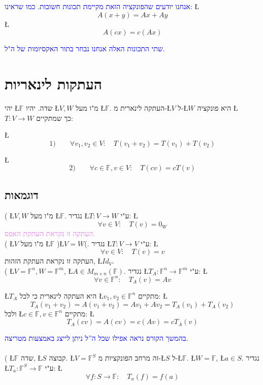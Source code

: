 \documentclass[english,hebrew]{article}
\begin{document}
\textcolor{blue}{אנחנו יודעים שהפונקציה הזאת מקיימת תכונות חשובות.
כמו שראינו:} \L{%
\[
A(x+y)=Ax+Ay
\]
}%
\L{%
\[
A(cx)=c(Ax)
\]
}%

\textcolor{blue}{שתי התכונות האלה אנחנו נבחר בתור האקסיומות של ה"ל.}

\section{העתקות לינאריות}

יהי \L{$\mathbb{F}$} שדה. יהיו \L{$V,W$} מ"ו מעל \L{$\mathbb{F}$}.
העתקה לינארית מ-\L{$V$} ל-\L{$W$} היא פונקציה \L{$T:V\to W$} כך
שמתקיים: 

\L{%
\[
1)\qquad\forall v_{1},v_{2}\in V:\quad T(v_{1}+v_{2})=T(v_{1})+T(v_{2})
\]
}%

\L{%
\[
2)\qquad\forall c\in\mathbb{F},v\in V:\quad T(cv)=cT(v)
\]
}%

\subsection{דוגמאות}

{\endL}( \L{$V,W$} מ"ו מעל \L{$\mathbb{F}$}. נגדיר \L{$T:V\to W$}
ע"י: \L{%
\[
\forall v\in V:\quad T(v)=0_{W}
\]
}%
\textcolor{violet}{העתקה זו נקראת העתקת האפס.}\\

{\endL}( \L{$V$} מ"ו מעל \L{$\mathbb{F}$} )\L{$V=W$}(.
נגדיר \L{$T:V\to V$} ע"י: \L{%
\[
\forall v\in V:\quad T(v)=v
\]
}%
העתקה זו נקראת העתקת הזהות, \L{$Id_{V}$}.\\

{\endL}( \L{$V=\mathbb{F}^{n},W=\mathbb{F}^{m}$}, \L{$A\in M_{m\times n}(\mathbb{F})$}.
נגדיר \L{$T_{A}:\mathbb{F}^{n}\to\mathbb{F}^{m}$} ע"י: \L{%
\[
\forall v\in\mathbb{F}^{n}:\quad T_{A}(v)=Av
\]
}%

\L{$T_{A}$} היא העתקה לינארית כי לכל \L{$v_{1},v_{2}\in\mathbb{F}^{n}$}
מתקיים: \L{%
\[
T_{A}(v_{1}+v_{2})=A(v_{1}+v_{2})=Av_{1}+Av_{2}=T_{A}(v_{1})+T_{A}(v_{2})
\]
}%
ולכל \L{$c\in\mathbb{F},v\in\mathbb{F}^{n}$} מתקיים: \L{%
\[
T_{A}(cv)=A(cv)=c(Av)=cT_{A}(v)
\]
}%

\textcolor{blue}{בהמשך הקורס נראה אפילו שכל ה\textquotedblright ל
ניתן לייצג באמצעות מטריצה.}\\
\\

{\endL}( \L{$\mathbb{F}$} שדה, \L{$S$} קבוצה. \L{$V=\mathbb{F}^{S}$}
זה מרחב הפונקציות מ-\L{$S$} ל-\L{$\mathbb{F}$}. \L{$W=\mathbb{F}$},
\L{$a\in S$}. נגדיר \L{$T_{a}:\mathbb{F}^{S}\to\mathbb{F}$} ע"י:
\L{%
\[
\forall f:S\to\mathbb{F}:\quad T_{a}(f)=f(a)
\]
}%
\end{document}
